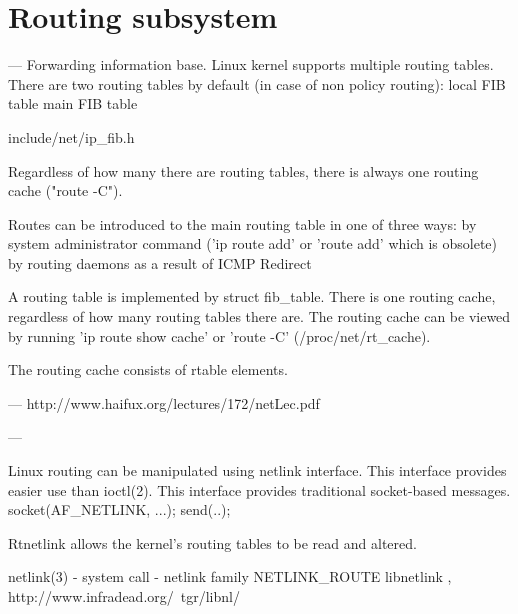 
\chapter{Routing subsystem}
---
Forwarding information base.
Linux kernel supports multiple routing tables.
There are two routing tables by default (in case of non policy routing):
local FIB table
main FIB table

include/net/ip_fib.h

Regardless of how many there are routing tables, there is always one routing cache ("route -C").


Routes can be introduced to the main routing table in one of three ways:
by system administrator command ('ip route add' or 'route add' which is obsolete)
by routing daemons
as a result of ICMP Redirect

A routing table is implemented by struct fib_table.
There is one routing cache, regardless of how many routing tables there are.
The routing cache can be viewed by running 'ip route show cache' or 'route -C' (/proc/net/rt_cache).

The routing cache consists of rtable elements.


---
http://www.haifux.org/lectures/172/netLec.pdf


---

Linux routing can be manipulated using netlink interface.
This interface provides easier use than ioctl(2).
This interface provides traditional socket-based messages.
socket(AF_NETLINK, ...);
send(..);

Rtnetlink allows the kernel's routing tables to be read and altered.

netlink(3) - system call - netlink family NETLINK_ROUTE
libnetlink , http://www.infradead.org/~tgr/libnl/

